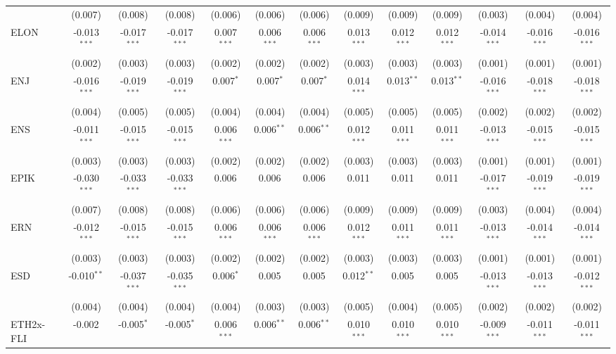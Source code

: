 \begin{table}[!htbp]
\begin{tabular}{@{\extracolsep{5pt}}lcccccccccccc}
  & (0.007) & (0.008) & (0.008) & (0.006) & (0.006) & (0.006) & (0.009) & (0.009) & (0.009) & (0.003) & (0.004) & (0.004) \\
 ELON & -0.013$^{***}$ & -0.017$^{***}$ & -0.017$^{***}$ & 0.007$^{***}$ & 0.006$^{***}$ & 0.006$^{***}$ & 0.013$^{***}$ & 0.012$^{***}$ & 0.012$^{***}$ & -0.014$^{***}$ & -0.016$^{***}$ & -0.016$^{***}$ \\
  & (0.002) & (0.003) & (0.003) & (0.002) & (0.002) & (0.002) & (0.003) & (0.003) & (0.003) & (0.001) & (0.001) & (0.001) \\
 ENJ & -0.016$^{***}$ & -0.019$^{***}$ & -0.019$^{***}$ & 0.007$^{*}$ & 0.007$^{*}$ & 0.007$^{*}$ & 0.014$^{***}$ & 0.013$^{**}$ & 0.013$^{**}$ & -0.016$^{***}$ & -0.018$^{***}$ & -0.018$^{***}$ \\
  & (0.004) & (0.005) & (0.005) & (0.004) & (0.004) & (0.004) & (0.005) & (0.005) & (0.005) & (0.002) & (0.002) & (0.002) \\
 ENS & -0.011$^{***}$ & -0.015$^{***}$ & -0.015$^{***}$ & 0.006$^{***}$ & 0.006$^{**}$ & 0.006$^{**}$ & 0.012$^{***}$ & 0.011$^{***}$ & 0.011$^{***}$ & -0.013$^{***}$ & -0.015$^{***}$ & -0.015$^{***}$ \\
  & (0.003) & (0.003) & (0.003) & (0.002) & (0.002) & (0.002) & (0.003) & (0.003) & (0.003) & (0.001) & (0.001) & (0.001) \\
 EPIK & -0.030$^{***}$ & -0.033$^{***}$ & -0.033$^{***}$ & 0.006$^{}$ & 0.006$^{}$ & 0.006$^{}$ & 0.011$^{}$ & 0.011$^{}$ & 0.011$^{}$ & -0.017$^{***}$ & -0.019$^{***}$ & -0.019$^{***}$ \\
  & (0.007) & (0.008) & (0.008) & (0.006) & (0.006) & (0.006) & (0.009) & (0.009) & (0.009) & (0.003) & (0.004) & (0.004) \\
 ERN & -0.012$^{***}$ & -0.015$^{***}$ & -0.015$^{***}$ & 0.006$^{***}$ & 0.006$^{***}$ & 0.006$^{***}$ & 0.012$^{***}$ & 0.011$^{***}$ & 0.011$^{***}$ & -0.013$^{***}$ & -0.014$^{***}$ & -0.014$^{***}$ \\
  & (0.003) & (0.003) & (0.003) & (0.002) & (0.002) & (0.002) & (0.003) & (0.003) & (0.003) & (0.001) & (0.001) & (0.001) \\
 ESD & -0.010$^{**}$ & -0.037$^{***}$ & -0.035$^{***}$ & 0.006$^{*}$ & 0.005$^{}$ & 0.005$^{}$ & 0.012$^{**}$ & 0.005$^{}$ & 0.005$^{}$ & -0.013$^{***}$ & -0.013$^{***}$ & -0.012$^{***}$ \\
  & (0.004) & (0.004) & (0.004) & (0.004) & (0.003) & (0.003) & (0.005) & (0.004) & (0.005) & (0.002) & (0.002) & (0.002) \\
 ETH2x-FLI & -0.002$^{}$ & -0.005$^{*}$ & -0.005$^{*}$ & 0.006$^{***}$ & 0.006$^{**}$ & 0.006$^{**}$ & 0.010$^{***}$ & 0.010$^{***}$ & 0.010$^{***}$ & -0.009$^{***}$ & -0.011$^{***}$ & -0.011$^{***}$ \\

\end{tabular}
\end{table}
